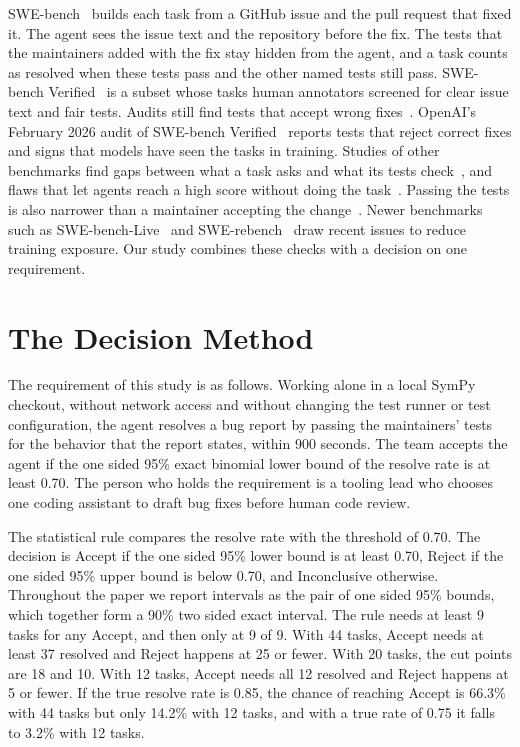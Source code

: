 \documentclass[runningheads]{llncs}
\begin{document}
SWE-bench~\cite{jimenez_swebench_2024} builds each task from a GitHub issue and the pull request that fixed it. The agent sees the issue text and the repository before the fix. The tests that the maintainers added with the fix stay hidden from the agent, and a task counts as resolved when these tests pass and the other named tests still pass. SWE-bench Verified~\cite{openai_swebench_verified_2024} is a subset whose tasks human annotators screened for clear issue text and fair tests. Audits still find tests that accept wrong fixes~\cite{yu_utboost_2025,wang_solved_issues_2026,aleithan_swebench_plus_2024,wang_auto_benchmark_audit_2026}. OpenAI's February 2026 audit of SWE-bench Verified~\cite{openai_swebench_verified_contamination_2025} reports tests that reject correct fixes and signs that models have seen the tasks in training. Studies of other benchmarks find gaps between what a task asks and what its tests check~\cite{ding_spec_oracle_gaps_2026,tu_benchguard_2026}, and flaws that let agents reach a high score without doing the task~\cite{mohl_transcript_flaws_2026,wang_benchjack_2026}. Passing the tests is also narrower than a maintainer accepting the change~\cite{whitfill_metr_merge_2026}. Newer benchmarks such as SWE-bench-Live~\cite{zhang_swebench_live_2025} and SWE-rebench~\cite{badertdinov_swe_rebench_2025} draw recent issues to reduce training exposure. Our study combines these checks with a decision on one requirement.

\section{The Decision Method}
\label{sec:method}
The requirement of this study is as follows. Working alone in a local SymPy checkout, without network access and without changing the test runner or test configuration, the agent resolves a bug report by passing the maintainers' tests for the behavior that the report states, within 900 seconds. The team accepts the agent if the one sided 95\% exact binomial lower bound of the resolve rate is at least 0.70. The person who holds the requirement is a tooling lead who chooses one coding assistant to draft bug fixes before human code review.

The statistical rule compares the resolve rate with the threshold of 0.70. The decision is Accept if the one sided 95\% lower bound is at least 0.70, Reject if the one sided 95\% upper bound is below 0.70, and Inconclusive otherwise. Throughout the paper we report intervals as the pair of one sided 95\% bounds, which together form a 90\% two sided exact interval. The rule needs at least 9 tasks for any Accept, and then only at 9 of 9. With 44 tasks, Accept needs at least 37 resolved and Reject happens at 25 or fewer. With 20 tasks, the cut points are 18 and 10. With 12 tasks, Accept needs all 12 resolved and Reject happens at 5 or fewer. If the true resolve rate is 0.85, the chance of reaching Accept is 66.3\% with 44 tasks but only 14.2\% with 12 tasks, and with a true rate of 0.75 it falls to 3.2\% with 12 tasks.
\end{document}
